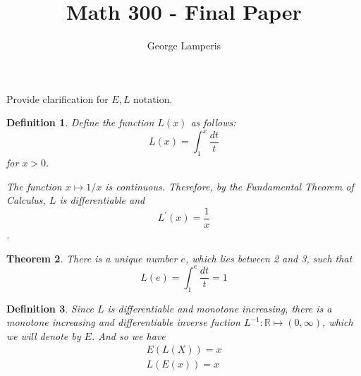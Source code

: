 \documentclass[12pt]{article}
\title{Math 300 - Final Paper}
\author{George Lamperis}
\date{}
\theoremstyle{mystyle}
\newtheorem{thm}{Theorem}
\newtheorem{defn}[thm]{Definition}
\newtheorem{prop}[thm]{Proposition}
\newcommand{\R}{\mathbb{R}}
\begin{document}
\maketitle

% 
% 
% 
% 
% 
% 
% 
% 
% 
% 

Provide clarification for $E,L$ notation.

\begin{defn}
  Define the function $L(x)$ as follows:
  $$ L(x) = \int_1^x \frac{dt}{t} $$
  for $x > 0$.
  
  
  
  The function $x \mapsto 1/x$ is continuous. Therefore, by the Fundamental
  Theorem of Calculus, $L$ is differentiable and
  $$ L^\prime(x) = \frac{1}{x} $$.
\end{defn}



\begin{thm}
  There is a unique number $e$, which lies between 2 and 3, such that 
  $$ L(e) = \int_1^e \frac{dt}{t} = 1 $$
\end{thm}

\begin{defn}
  Since $L$ is differentiable and monotone increasing, there is a monotone
  increasing and differentiable inverse fuction $L^{-1}: \R \mapsto (0, \infty)$,
  which we will denote by $E$. And so we have
  \begin{align*}
    E(L(X)) = x \\
    L(E(x)) = x
  \end{align*} 
\end{defn}
\end{document}
